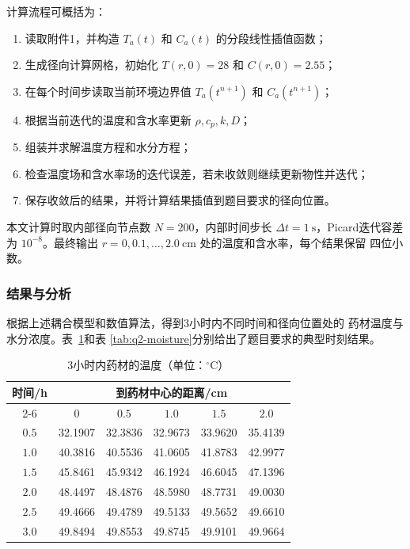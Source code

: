 \documentclass[12pt,a4paper]{article}
\begin{document}
计算流程可概括为：

\begin{enumerate}
\item 读取附件1，并构造 $T_a(t)$ 和 $C_a(t)$ 的分段线性插值函数；
\item 生成径向计算网格，初始化 $T(r,0)=28$ 和 $C(r,0)=2.55$；
\item 在每个时间步读取当前环境边界值 $T_a(t^{n+1})$ 和
$C_a(t^{n+1})$；
\item 根据当前迭代的温度和含水率更新 $\rho,c_p,k,D$；
\item 组装并求解温度方程和水分方程；
\item 检查温度场和含水率场的迭代误差，若未收敛则继续更新物性并迭代；
\item 保存收敛后的结果，并将计算结果插值到题目要求的径向位置。
\end{enumerate}

本文计算时取内部径向节点数 $N=200$，内部时间步长
$\Delta t=1\ \mathrm{s}$，Picard迭代容差为 $10^{-8}$。最终输出
$r=0,0.1,\ldots,2.0\ \mathrm{cm}$ 处的温度和含水率，每个结果保留
四位小数。

\subsubsection{结果与分析}

根据上述耦合模型和数值算法，得到3小时内不同时间和径向位置处的
药材温度与水分浓度。表~\ref{tab:q2-temperature}和表
\ref{tab:q2-moisture}分别给出了题目要求的典型时刻结果。

\begin{table}[H]
\centering
\caption{3小时内药材的温度（单位：$^\circ$C）}
\label{tab:q2-temperature}
\begin{tabular}{cccccc}
\toprule
\multirow{2}{*}{时间/h}
& \multicolumn{5}{c}{到药材中心的距离/cm}\\
\cmidrule(lr){2-6}
& $0$ & $0.5$ & $1.0$ & $1.5$ & $2.0$\\
\midrule
$0.5$ & 32.1907 & 32.3836 & 32.9673 & 33.9620 & 35.4139\\
$1.0$ & 40.3816 & 40.5536 & 41.0605 & 41.8783 & 42.9977\\
$1.5$ & 45.8461 & 45.9342 & 46.1924 & 46.6045 & 47.1396\\
$2.0$ & 48.4497 & 48.4876 & 48.5980 & 48.7731 & 49.0030\\
$2.5$ & 49.4666 & 49.4789 & 49.5133 & 49.5652 & 49.6610\\
$3.0$ & 49.8494 & 49.8553 & 49.8745 & 49.9101 & 49.9664\\
\bottomrule
\end{tabular}
\end{table}
\end{document}
